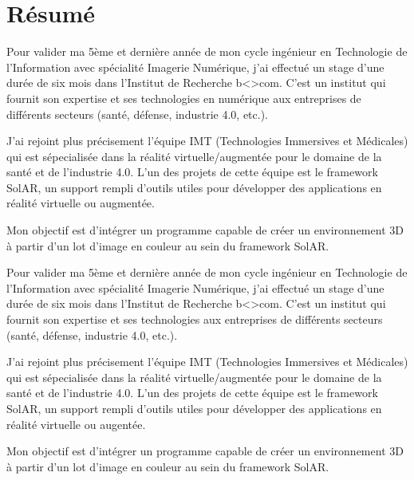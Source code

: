 \chapter*{Résumé}

\par
Pour valider ma 5ème et dernière année de mon cycle ingénieur en Technologie de l’Information avec spécialité Imagerie Numérique, j’ai effectué un stage d’une durée de six mois dans l’Institut de Recherche b<>com. C'est un institut qui fournit son expertise et ses technologies en numérique aux entreprises de différents secteurs (santé, défense, industrie 4.0, etc.).

\par
J'ai rejoint plus précisement l'équipe IMT (Technologies Immersives et Médicales) qui est sépecialisée dans la réalité virtuelle/augmentée pour le domaine de la santé et de l'industrie 4.0. L'un des projets de cette équipe est le framework SolAR, un support rempli d'outils utiles pour développer des applications en réalité virtuelle ou augmentée.

\par
Mon objectif est d'intégrer un programme capable de créer un environnement 3D à partir d'un lot d'image en couleur au sein du framework SolAR.

\vspace{40pt}

\color{gray}


\par
Pour valider ma 5ème et dernière année de mon cycle ingénieur en Technologie de l’Information avec spécialité Imagerie Numérique, j’ai effectué un stage d’une durée de six mois dans l’Institut de Recherche b<>com. C'est un institut qui fournit son expertise et ses technologies aux entreprises de différents secteurs (santé, défense, industrie 4.0, etc.).

\par
J'ai rejoint plus précisement l'équipe IMT (Technologies Immersives et Médicales) qui est sépecialisée dans la réalité virtuelle/augmentée pour le domaine de la santé et de l'industrie 4.0. L'un des projets de cette équipe est le framework SolAR, un support rempli d'outils utiles pour développer des applications en réalité virtuelle ou augentée.

\par
Mon objectif est d'intégrer un programme capable de créer un environnement 3D à partir d'un lot d'image en couleur au sein du framework SolAR.

\color{black}